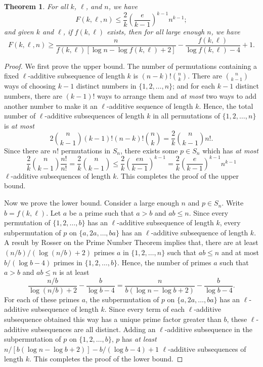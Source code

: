 \documentclass[11pt]{article}
\newtheorem{theorem}{Theorem}[section]
\theoremstyle{definition}
\begin{document}
\begin{theorem}\label{Theorem:NumberOfAdditiveGeneral}
For all $k$, $\ell$, and $n$, we have
    \[
    F(k,\ell,n)\leq\frac{2}{k}\left(\frac{e}{k-1}\right)^{k-1}n^{k-1};
    \]
    and given $k$ and $\ell$, if $f(k,\ell)$ exists, then for all large enough $n$, we have
    \[
    F(k,\ell,n)\geq \frac{n}{f(k,\ell)[\log n-\log f(k,\ell)+2]}-\frac{f(k,\ell)}{\log f(k,\ell)-4}+1.
    \]
\end{theorem}
\begin{proof}
We first prove the upper bound. The number of permutations containing a fixed $\ell$-additive subsequence of length $k$ is $(n-k)!{n \choose k}$. There are ${n\choose k-1}$ ways of choosing $k-1$ distinct numbers in $\{1,2,\ldots,n\}$; and for each $k-1$ distinct numbers, there are $(k-1)!$ ways to arrange them and \textit{at most} two ways to add another number to make it an $\ell$-additive sequence of length $k$. Hence, the total number of $\ell$-additive subsequences of length $k$ in all permutations of $\{1,2,\ldots,n\}$ is \textit{at most} 
    \[
    2{n\choose k-1}(k-1)!(n-k)!{n \choose k}=\frac{2}{k}{n\choose k-1}n!.
    \]
Since there are $n!$ permutations in $S_{n}$, there exists some $p\in S_n$ which has \textit{at most} \[\frac{2}{k}{n\choose k-1}\frac{n!}{n!}=\frac{2}{k}{n\choose k-1}\leq\frac{2}{k}\left(\frac{en}{k-1}\right)^{k-1}=\frac{2}{k}\left(\frac{e}{k-1}\right)^{k-1}n^{k-1}\]
$\ell$-additive subsequences of length $k$. This completes the proof of the upper bound.

Now we prove the lower bound. Consider a large enough $n$ and $p\in S_n$. Write $b=f(k,\ell)$. Let $a$ be a prime such that $a>b$ and $ab\leq n$. Since every permutation of $\{1,2,\ldots,b\}$ has an $\ell$-additive subsequence of length $k$, every subpermutation of $p$ on $\{a,2a,\ldots,ba\}$ has an $\ell$-additive subsequence of length $k$. A result by Rosser \cite{Rosser1941} on the Prime Number Theorem \cite[p.~274]{Nathanson2000} implies that, there are at least $(n/b)/(\log(n/b)+2)$ primes $a$ in $\{1,2,\ldots,n\}$ such that $ab\leq n$  and at most $b/(\log b-4)$ primes in $\{1,2,\ldots,b\}$. Hence, the number of primes $a$ such that $a>b$ and $ab\leq n$ is at least
\[
\frac{n/b}{\log(n/b)+2}-\frac{b}{\log b-4}=\frac{n}{b(\log n-\log b+2)}-\frac{b}{\log b-4}.
\]
For each of these primes $a$, the subpermutation of $p$ on $\{a,2a,\ldots,ba\}$ has an $\ell$-additive subsequence of length $k$. Since every term of each $\ell$-additive subsequence obtained this way has a unique prime factor greater than $b$, these $\ell$-additive subsequences are all distinct. Adding an $\ell$-additive subsequence in the subpermutation of $p$ on $\{1,2,\ldots,b\}$, $p$ has \textit{at least} $n/[b(\log n-\log b+2)]-b/(\log b-4)+1$ $\ell$-additive subsequences of length $k$. This completes the proof of the lower bound.
\end{proof} 
\end{document}
